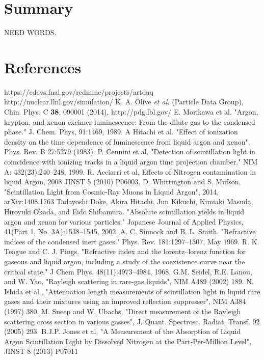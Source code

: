\documentclass[12pt]{elsarticle}
\begin{document}
\section{Summary}
NEED WORDS.
\section{References}

\begin{thebibliography}{99}

 https://cdcvs.fnal.gov/redmine/projects/artdaq
 http://nuclear.llnl.gov/simulation/
 K. A. Olive {\it et al.} (Particle Data Group), Chin. Phys. C {\bf 38}, 090001 (2014), http://pdg.lbl.gov/
 E. Morikawa et al. "Argon, krypton, and xenon excimer luminescence: From the dilute gas to the condensed phase." J. Chem. Phys, 91:1469, 1989.
 A Hitachi et al. "Effect of ionization density on the time dependence of luminescence from liquid argon and xenon", Phys. Rev. B 27:5279 (1983). P. Cennini et al, "Detection of scintillation light in coincidence with ionizing tracks in a liquid argon time projection chamber." NIM A: 432(23):240–248, 1999.  R. Acciarri et al, Effects of Nitrogen contamination in liquid Argon, 2008 JINST 5 (2010) P06003.  D. Whittington and S. Mufson, "Scintillation Light from Cosmic-Ray Muons in Liquid Argon", 2014, arXiv:1408.1763
 Tadayoshi Doke, Akira Hitachi, Jun Kikuchi, Kimiaki Masuda, Hiroyuki Okada, and Eido Shibamura. "Absolute scintillation yields in liquid argon and xenon for various particles." Japanese Journal of Applied Physics, 41(Part 1, No. 3A):1538–1545, 2002.
 A. C. Sinnock and B. L. Smith. "Refractive indices of the condensed inert gases." Phys. Rev. 181:1297–1307, May 1969.   R. K. Teague and C. J. Pings. "Refractive index and the lorentz–lorenz function for gaseous and liquid argon, including a study of the coexistence curve near the critical state." J Chem Phys, 48(11):4973–4984, 1968.
 G.M. Seidel, R.E. Lanou, and W. Yao, "Rayleigh scattering in rare-gas liquids", NIM A489 (2002) 189.   N. Ishida et al., "Attenuation length measurements of scintillation light in liquid rare gases and their mixtures using an improved reflection suppresser", NIM A384 (1997) 380. M. Sneep and W. Ubachs, "Direct measurement of the Rayleigh scattering cross section in various gasses", J. Quant. Spectrosc. Radiat. Transf. 92 (2005) 293.
 B.J.P. Jones et al, "A Measurement of the Absorption of Liquid Argon Scintillation Light by Dissolved Nitrogen at the Part-Per-Million Level", JINST 8 (2013) P07011


\end{thebibliography}
\end{document}
